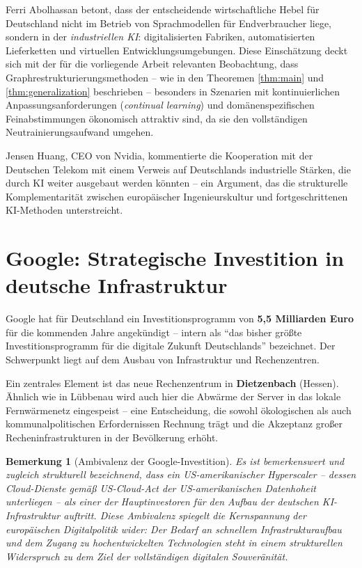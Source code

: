 \documentclass[12pt, a4paper, openany]{report}
\newtheorem{remark}[theorem]{Bemerkung}
\begin{document}
Ferri Abolhassan betont, dass der entscheidende wirtschaftliche Hebel für
Deutschland nicht im Betrieb von Sprachmodellen für Endverbraucher liege,
sondern in der \emph{industriellen KI}: digitalisierten Fabriken,
automatisierten Lieferketten und virtuellen Entwicklungsumgebungen. Diese
Einschätzung deckt sich mit der für die vorliegende Arbeit relevanten
Beobachtung, dass Graphrestrukturierungsmethoden -- wie in den Theoremen
\ref{thm:main} und \ref{thm:generalization} beschrieben -- besonders in
Szenarien mit kontinuierlichen Anpassungsanforderungen
(\textit{continual learning}) und domänenspezifischen Feinabstimmungen
ökonomisch attraktiv sind, da sie den vollständigen Neutrainierungsaufwand
umgehen.

Jensen Huang, CEO von Nvidia, kommentierte die Kooperation mit der
Deutschen Telekom mit einem Verweis auf Deutschlands industrielle Stärken,
die durch KI weiter ausgebaut werden könnten -- ein Argument, das die
strukturelle Komplementarität zwischen europäischer Ingenieurskultur und
fortgeschrittenen KI-Methoden unterstreicht.

\section{Google: Strategische Investition in deutsche Infrastruktur}
\label{sec:google_deutschland}

Google hat für Deutschland ein Investitionsprogramm von \textbf{5,5 Milliarden
	Euro} für die kommenden Jahre angekündigt -- intern als ``das bisher größte
Investitionsprogramm für die digitale Zukunft Deutschlands'' bezeichnet. Der
Schwerpunkt liegt auf dem Ausbau von Infrastruktur und Rechenzentren.

Ein zentrales Element ist das neue Rechenzentrum in \textbf{Dietzenbach}
(Hessen). Ähnlich wie in Lübbenau wird auch hier die Abwärme der Server in
das lokale Fernwärmenetz eingespeist -- eine Entscheidung, die sowohl
ökologischen als auch kommunalpolitischen Erfordernissen Rechnung trägt und
die Akzeptanz großer Recheninfrastrukturen in der Bevölkerung erhöht.

\begin{remark}[Ambivalenz der Google-Investition]
	\label{rem:google_ambivalenz}
	Es ist bemerkenswert und zugleich strukturell bezeichnend, dass ein
	US-amerikanischer Hyperscaler -- dessen Cloud-Dienste gemäß US-Cloud-Act
	der US-amerikanischen Datenhoheit unterliegen -- als einer der
	Hauptinvestoren für den Aufbau der deutschen KI-Infrastruktur auftritt.
	Diese Ambivalenz spiegelt die Kernspannung der europäischen Digitalpolitik
	wider: Der Bedarf an schnellem Infrastrukturaufbau und dem Zugang zu
	hochentwickelten Technologien steht in einem strukturellen Widerspruch
	zu dem Ziel der vollständigen digitalen Souveränität.
\end{remark}
\end{document}
